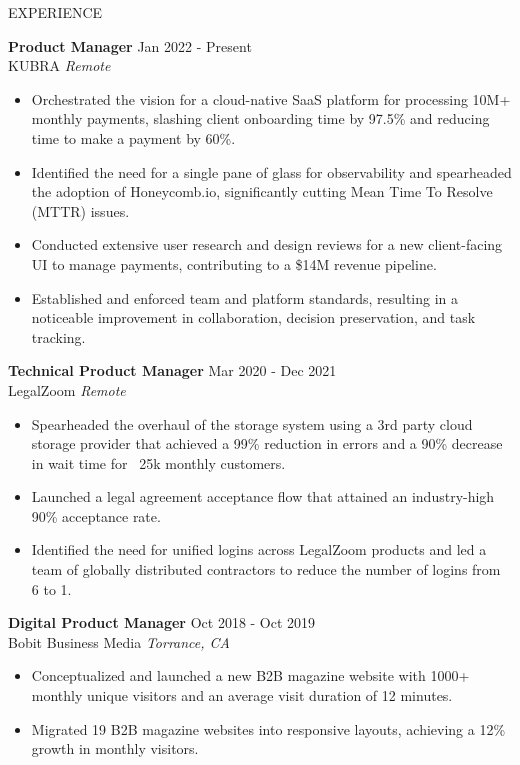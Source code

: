 \documentclass{resume} %
\begin{document}
\begin{rSection}{EXPERIENCE}

\textbf{Product Manager} \hfill Jan 2022 - Present\\
KUBRA \hfill \textit{Remote}
 \begin{itemize}
    \itemsep -3pt {} 
     \item Orchestrated the vision for a cloud-native SaaS platform for processing 10M+ monthly payments, slashing client onboarding time by 97.5\% and reducing time to make a payment by 60\%.
     \item Identified the need for a single pane of glass for observability and spearheaded the adoption of Honeycomb.io, significantly cutting Mean Time To Resolve (MTTR) issues.
     \item Conducted extensive user research and design reviews for a new client-facing UI to manage payments, contributing to a \$14M revenue pipeline.
     \item Established and enforced team and platform standards, resulting in a noticeable improvement in collaboration, decision preservation, and task tracking.
 \end{itemize}
 
\textbf{Technical Product Manager} \hfill Mar 2020 - Dec 2021\\
LegalZoom \hfill \textit{Remote}
 \begin{itemize}
    \itemsep -3pt {} 
     \item Spearheaded the overhaul of the storage system using a 3rd party cloud storage provider that achieved a 99\% reduction in errors and a 90\% decrease in wait time for ~25k monthly customers.
     \item Launched a legal agreement acceptance flow that attained an industry-high 90\% acceptance rate.
     \item Identified the need for unified logins across LegalZoom products and led a team of globally distributed contractors to reduce the number of logins from 6 to 1.
 \end{itemize}

\textbf{Digital Product Manager} \hfill Oct 2018 - Oct 2019\\
Bobit Business Media \hfill \textit{Torrance, CA}
 \begin{itemize}
    \itemsep -3pt {} 
     \item Conceptualized and launched a new B2B magazine website with 1000+ monthly unique visitors and an average visit duration of 12 minutes.    
     \item Migrated 19 B2B magazine websites into responsive layouts, achieving a 12\% growth in monthly visitors.
 \end{itemize}


\end{rSection}
\end{document}
